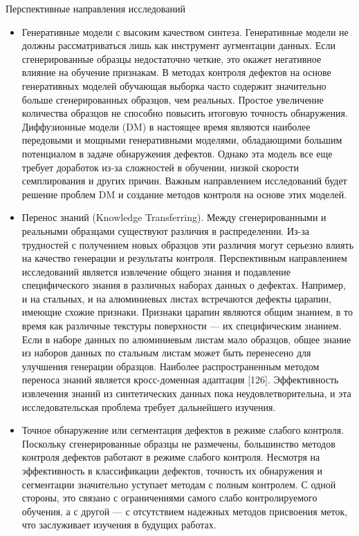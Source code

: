 \documentclass[14pt,a4paper]{article}
\begin{document}
Перспективные направления исследований
\begin{itemize}
	\item Генеративные модели с высоким качеством синтеза. Генеративные модели не должны рассматриваться лишь как инструмент аугментации данных. Если сгенерированные образцы недостаточно четкие, это окажет негативное влияние на обучение признакам. В методах контроля дефектов на основе генеративных моделей обучающая выборка часто содержит значительно больше сгенерированных образцов, чем реальных. Простое увеличение количества образцов не способно повысить итоговую точность обнаружения. Диффузионные модели (DM) в настоящее время являются наиболее передовыми и мощными генеративными моделями, обладающими большим потенциалом в задаче обнаружения дефектов. Однако эта модель все еще требует доработок из-за сложностей в обучении, низкой скорости семплирования и других причин. Важным направлением исследований будет решение проблем DM и создание методов контроля на основе этих моделей.

	\item Перенос знаний (Knowledge Transferring). Между сгенерированными и реальными образцами существуют различия в распределении. Из-за трудностей с получением новых образцов эти различия могут серьезно влиять на качество генерации и результаты контроля. Перспективным направлением исследований является извлечение общего знания и подавление специфического знания в различных наборах данных о дефектах. Например, и на стальных, и на алюминиевых листах встречаются дефекты царапин, имеющие схожие признаки. Признаки царапин являются общим знанием, в то время как различные текстуры поверхности — их специфическим знанием. Если в наборе данных по алюминиевым листам мало образцов, общее знание из наборов данных по стальным листам может быть перенесено для улучшения генерации образцов. Наиболее распространенным методом переноса знаний является кросс-доменная адаптация [126]. Эффективность извлечения знаний из синтетических данных пока неудовлетворительна, и эта исследовательская проблема требует дальнейшего изучения.

	\item Точное обнаружение или сегментация дефектов в режиме слабого контроля. Поскольку сгенерированные образцы не размечены, большинство методов контроля дефектов работают в режиме слабого контроля. Несмотря на эффективность в классификации дефектов, точность их обнаружения и сегментации значительно уступает методам с полным контролем. С одной стороны, это связано с ограничениями самого слабо контролируемого обучения, а с другой — с отсутствием надежных методов присвоения меток, что заслуживает изучения в будущих работах.


\end{itemize}
\end{document}
